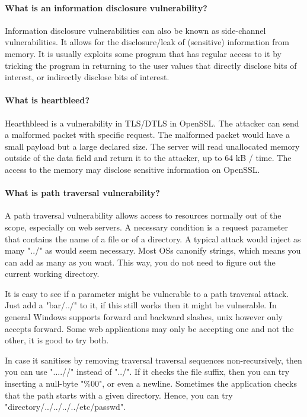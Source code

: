 \paragraph{What is an information disclosure vulnerability?}
Information disclosure vulnerabilities can also be known as side-channel vulnerabilities. It allows for the disclosure/leak of (sensitive) information from memory. It is usually exploits some program that has regular access to it by tricking the program in returning to the user values that directly disclose bits of interest, or indirectly disclose bits of interest.

\paragraph{What is heartbleed?}
Hearthbleed is a vulnerability in TLS/DTLS in OpenSSL. The attacker can send a malformed packet with specific request. The malformed packet would have a small payload but a large declared size. The server will read unallocated memory outside of the data field and return it to the attacker, up to 64 kB / time. The access to the memory may disclose sensitive information on OpenSSL.

\paragraph{What is path traversal vulnerability?}
A path traversal vulnerability allows access to resources normally out of the scope, especially on web servers. A necessary condition is a request parameter that contains the name of a file or of a directory. A typical attack would inject as many "../" as would seem necessary. Most OSs canonify strings, which means you can add as many as you want. This way, you do not need to figure out the current working directory.

It is easy to see if a parameter might be vulnerable to a path traversal attack. Just add a "bar/../" to it, if this still works then it might be vulnerable. In general Windows supports forward and backward slashes, unix however only accepts forward. Some web applications may only be accepting one and not the other, it is good to try both.

In case it sanitises by removing traversal traversal sequences non-recursively, then you can use "....//" instead of "../". If it checks the file suffix, then you can try inserting a null-byte "\%00", or even a newline. Sometimes the application checks that the path starts with a given directory. Hence, you can try "directory/../../../../etc/passwd".

